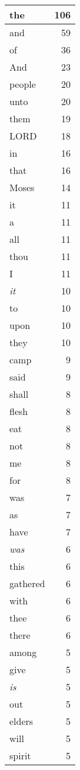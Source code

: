 \begin{center}
\begin{longtable}{l|r}
\hline \hline
\endlastfoot
the & 106 \\ \hline
and & 59 \\ \hline
of & 36 \\ \hline
And & 23 \\ \hline
people & 20 \\ \hline
unto & 20 \\ \hline
them & 19 \\ \hline
LORD & 18 \\ \hline
in & 16 \\ \hline
that & 16 \\ \hline
Moses & 14 \\ \hline
it & 11 \\ \hline
a & 11 \\ \hline
all & 11 \\ \hline
thou & 11 \\ \hline
I & 11 \\ \hline
\emph{it} & 10 \\ \hline
to & 10 \\ \hline
upon & 10 \\ \hline
they & 10 \\ \hline
camp & 9 \\ \hline
said & 9 \\ \hline
shall & 8 \\ \hline
flesh & 8 \\ \hline
eat & 8 \\ \hline
not & 8 \\ \hline
me & 8 \\ \hline
for & 8 \\ \hline
was & 7 \\ \hline
as & 7 \\ \hline
have & 7 \\ \hline
\emph{was} & 6 \\ \hline
this & 6 \\ \hline
gathered & 6 \\ \hline
with & 6 \\ \hline
thee & 6 \\ \hline
there & 6 \\ \hline
among & 5 \\ \hline
give & 5 \\ \hline
\emph{is} & 5 \\ \hline
out & 5 \\ \hline
elders & 5 \\ \hline
will & 5 \\ \hline
spirit & 5 \\ \hline

\end{longtable}
\end{center}
